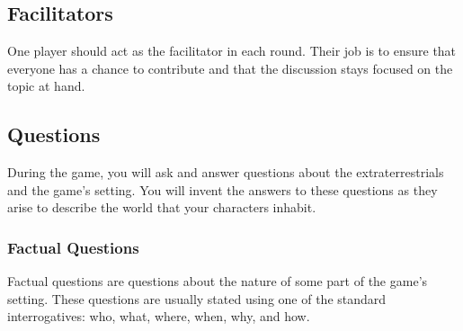 \documentclass[a6paper, 11pt, parskip=half, DIV=15]{scrartcl}
\begin{document}
\subsection*{Facilitators}
One player should act as the facilitator in each round. Their job is to ensure that everyone has a chance to contribute and that the discussion stays focused on the topic at hand.

\subsection*{Questions}
During the game, you will ask and answer questions about the extraterrestrials and the game's setting.
You will invent the answers to these questions as they arise to describe the world that your characters inhabit.

\newpage
\enlargethispage{1.75\baselineskip}


\subsubsection*{Factual Questions}

Factual questions are questions about the nature of some part of the game's setting.
These questions are usually stated using one of the standard interrogatives: who, what, where, when, why, and how.

\vfill

\begin{center}
\end{center}
\end{document}
